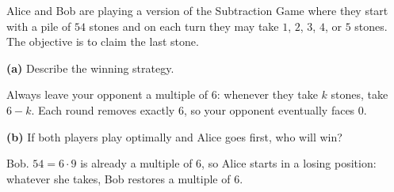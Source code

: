 \documentclass[12pt]{ximera}
\begin{document}
\begin{problem}
Alice and Bob are playing a version of the Subtraction Game where they start with a pile
of $54$ stones and on each turn they may take $1$, $2$, $3$, $4$, or $5$ stones. The
objective is to claim the last stone.

\begin{prompt}
\textbf{(a)} Describe the winning strategy.

\begin{freeResponse}
\end{freeResponse}

\begin{feedback}
Always leave your opponent a multiple of $6$: whenever they take $k$ stones, take $6-k$.
Each round removes exactly $6$, so your opponent eventually faces $0$.
\end{feedback}
\end{prompt}

\begin{prompt}
\textbf{(b)} If both players play optimally and Alice goes first, who will win?

\begin{multipleChoice}
\end{multipleChoice}

\begin{feedback}
Bob. $54=6\cdot 9$ is already a multiple of $6$, so Alice starts in a losing position:
whatever she takes, Bob restores a multiple of $6$.
\end{feedback}
\end{prompt}
\end{problem}
\end{document}
